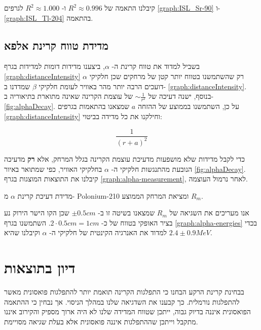 \documentclass{article}
\begin{document}
קיבלנו התאמה של
$R^2 \approx 0.996$
ו-
$R^2 \approx 1.000$
לגרפים
\ref{graph:ISL_Sr-90}
ו-
\ref{graph:ISL_Tl-204}
בהתאמה.

\subsection{
מדידת טווח קרינת אלפא
}

בשביל למדוד את טווח קרינת ה-
$\alpha$,
ביצענו מדידות דומות למדידות בגרף
\ref{graph:distanceIntensity}
רק שהשתמשנו בטווח יותר קטן של מרחקים שכן חלקיקי
$\alpha$
דועכים הרבה יותר מהר באוויר לעומת חלקיקי
$\beta$
שמדדנו ב-
\ref{graph:distanceIntensity}.
בנוסף, ישנה דעיכה של
$\sim \frac{1}{r^2}$
של עוצמת הקרינה שאינה מתוארת בתיאוריה ב-
\ref{fig:alphaDecay}.
על כן, השתמשנו בממוצע של ההזחה
$a$
שמצאנו בהתאמות בגרפים
\ref{graph:distanceIntensity}
וחילקנו את כל מדידה בביטוי:

$$ \frac{1}{(r+a)^2}$$

כדי לקבל מדידות שלא מושפעות מדעיכת עוצמת הקרינה בגלל המרחק, אלא 
\textbf{
רק
}
מדעיכה הנובעת מהתנגשות חלקיקי ה-
$\alpha$
בחלקיקי האוויר, כפי שמתואר באיור
\ref{fig:alphaDecay}.
קיבלנו את התוצאות המוצגות בגרף
\ref{graph:alpha-measurement},
לאחר נרמול העוצמה.

\begin{graph}[H]
    	\centering
    	\resizebox{0.795\textwidth}{!}{}
    	\caption{
    	מדידת דעיכת קרינת
    	$\alpha$
    	מ-
    	\textenglish{Polonium-210}
    	ומציאת המרחק הממוצע
    	$R_m$.
    	}
    	\label{graph:alpha-measurement}
\end{graph}

אנו מעריכים את השגיאה של
$R_m$
שמצאנו בשיטה זו ב-
$\pm0.5cm$
שכן הקו הישר הירוק נע בציר האופקי בטווח של כ-
$2\cdot 0.5 cm = 1 cm$.
השתמשנו בגרף
\ref{graph:alpha-energies}
בכדי למדוד את האנרגיה הקינטית של חלקיקי ה-
$\alpha$
וקיבלנו שהיא
$2.4 \pm 0.9 MeV$.

\section{
דיון בתוצאות
}


בבחינת קרינת הרקע הבחנו כי התפלגות הקרינה תואמת יותר להתפלגות פואסונית מאשר להתפלגות נורמלית. כך קבענו את השדגיאה שלנו במהלך הניסוי. אך נבחין כי ההתאמה הפואסונית איננה בדיוק גבוה, ייתכן שטווח המדידה שלנו לא היה ארוך מספיק והקירוב איננו מתקבל וייתכן שההתפלגות איננה פואסונית אלא בעלת שגיאה מסויימת.
\end{document}
